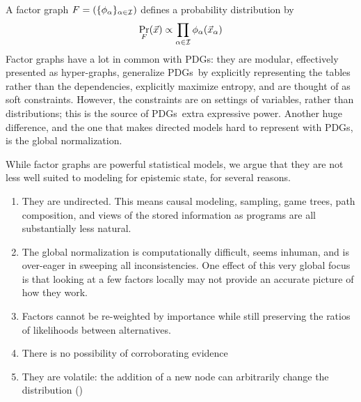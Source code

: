\documentclass{article}
\newcommand{\MN}{PDG}
\newcommand{\MNs}{\MN s}
\numberwithin{equation}{section}
\begin{document}
	A factor graph $F = (\{\phi_\alpha\}_{\alpha \in \cal I})$ defines a probability distribution by 
	\[ \Pr_F(\vec x) \propto \prod_{\alpha \in \cal I} \phi_\alpha(\vec x_{\alpha}) \]
	Factor graphs have a lot in common with \MNs: they are modular, effectively presented as hyper-graphs, generalize \MNs\ by explicitly representing the tables rather than the dependencies, explicitly maximize entropy, and are thought of as soft constraints. However, the constraints are on settings of variables, rather than distributions; this is the source of \MNs\ extra expressive power. Another huge difference, and the one that makes directed models hard to represent with \MNs, is the global normalization.

	While factor graphs are powerful statistical models, we argue that they are not less well suited to modeling for epistemic state, for several reasons. 
	\begin{enumerate}
		\item They are undirected. This means causal modeling, sampling, game trees, path composition, and views of the stored information as programs are all substantially less natural. \label{fgproblem:undirected}
		\item The global normalization is computationally difficult, seems inhuman, and is over-eager in sweeping all inconsistencies. One effect of this very global focus is that looking at a few factors locally may not provide an accurate picture of how they work. \label{fgproblem:global}
		\item Factors cannot be re-weighted by importance while still preserving the ratios of likelihoods between alternatives. \label{fgproblem:reweight}
		\item There is no possibility of corroborating evidence \label{fgproblem:corrob}
		\item They are volatile: the addition of a new node can arbitrarily change the distribution \label{fgproblem:volatile} ()
	\end{enumerate}
	
\end{document}
